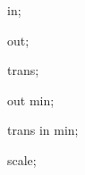 {
  

  \attribute in;
  
  \attribute out;
  
  \attribute trans;

  \attribute out min;

  \attribute trans in min;

  \attribute scale;

}
